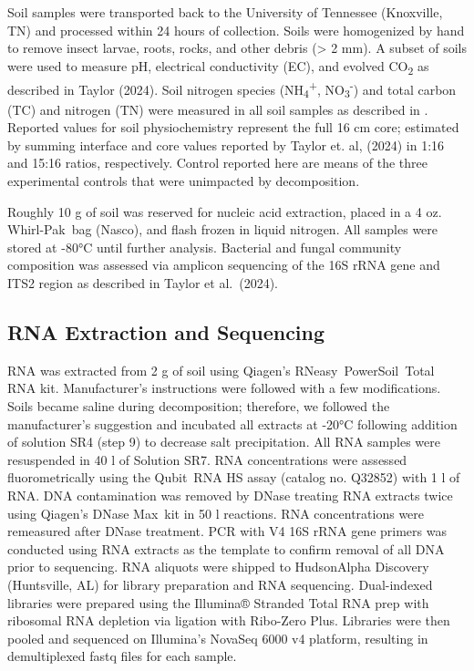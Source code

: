 \documentclass[
  sn-nature,
  lineno, referee]{sn-jnl}
\begin{document}
Soil samples were transported back to the University of Tennessee
(Knoxville, TN) and processed within 24 hours of collection. Soils were
homogenized by hand to remove insect larvae, roots, rocks, and other
debris (\textgreater{} 2 mm). A subset of soils were used to measure pH,
electrical conductivity (EC), and evolved CO\textsubscript{2} as
described in Taylor (2024). Soil nitrogen species
(NH\textsubscript{4}\textsuperscript{+},
NO\textsubscript{3}\textsuperscript{-}) and total carbon (TC) and
nitrogen (TN) were measured in all soil samples as described in
\citep{taylor_transient_2024}. Reported values for soil physiochemistry
represent the full 16 cm core; estimated by summing interface and core
values reported by Taylor et. al, (2024) \citep{taylor_transient_2024}
in 1:16 and 15:16 ratios, respectively. Control reported here are means
of the three experimental controls that were unimpacted by
decomposition.

Roughly 10 g of soil was reserved for nucleic acid extraction, placed in
a 4 oz. Whirl-Pak\texttrademark~bag (Nasco), and flash frozen in liquid
nitrogen. All samples were stored at -80°C until further analysis.
Bacterial and fungal community composition was assessed via amplicon
sequencing of the 16S rRNA gene and ITS2 region as described in Taylor
et al.~(2024).

\subsection{RNA Extraction and
Sequencing}\label{rna-extraction-and-sequencing}

RNA was extracted from 2 g of soil using Qiagen's
RNeasy\textregistered~PowerSoil\textregistered~Total RNA kit.
Manufacturer's instructions were followed with a few modifications.
Soils became saline during decomposition; therefore, we followed the
manufacturer's suggestion and incubated all extracts at -20°C following
addition of solution SR4 (step 9) to decrease salt precipitation. All
RNA samples were resuspended in 40 \textmu l of Solution SR7. RNA
concentrations were assessed fluorometrically using the
Qubit\textregistered~RNA HS assay (catalog no. Q32852) with 1 \textmu l
of RNA. DNA contamination was removed by DNase treating RNA extracts
twice using Qiagen's DNase Max\textregistered~kit in 50 \textmu l
reactions. RNA concentrations were remeasured after DNase treatment. PCR
with V4 16S rRNA gene primers
\citep{apprill_minor_2015, parada_every_2016} was conducted using RNA
extracts as the template to confirm removal of all DNA prior to
sequencing. RNA aliquots were shipped to HudsonAlpha Discovery
(Huntsville, AL) for library preparation and RNA sequencing.
Dual-indexed libraries were prepared using the Illumina® Stranded Total
RNA prep with ribosomal RNA depletion via ligation with Ribo-Zero Plus.
Libraries were then pooled and sequenced on Illumina's NovaSeq 6000 v4
platform, resulting in demultiplexed fastq files for each sample.
\end{document}
